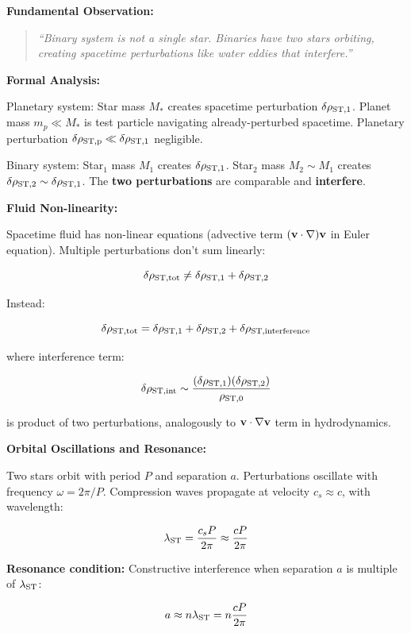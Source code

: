 \documentclass[11pt,a4paper]{article}
\begin{document}
\textbf{Fundamental Observation:}

\begin{quote}
\emph{``Binary system is not a single star. Binaries have two stars
orbiting, creating spacetime perturbations like water eddies that
interfere.''}
\end{quote}

\textbf{Formal Analysis:}

Planetary system: Star mass \(M_*\) creates spacetime perturbation
\(\delta \rho_{\rm ST,1}\). Planet mass \(m_p \ll M_*\) is test particle
navigating already-perturbed spacetime. Planetary perturbation
\(\delta \rho_{\rm ST,p} \ll \delta \rho_{\rm ST,1}\) negligible.

Binary system: Star$_{1}$ mass \(M_1\) creates \(\delta \rho_{\rm ST,1}\).
Star$_{2}$ mass \(M_2 \sim M_1\) creates
\(\delta \rho_{\rm ST,2} \sim \delta \rho_{\rm ST,1}\). The \textbf{two
perturbations} are comparable and \textbf{interfere}.

\textbf{Fluid Non-linearity:}

Spacetime fluid has non-linear equations (advective term
\(({\bf v} \cdot \nabla){\bf v}\) in Euler equation). Multiple
perturbations don't sum linearly:

\[\delta \rho_{\rm ST,tot} \neq \delta \rho_{\rm ST,1} + \delta \rho_{\rm ST,2}\]

Instead:

\[\delta \rho_{\rm ST,tot} = \delta \rho_{\rm ST,1} + \delta \rho_{\rm ST,2} + \delta \rho_{\rm ST,interference}\]

where interference term:

\[\delta \rho_{\rm ST,int} \sim \frac{(\delta \rho_{\rm ST,1}) (\delta \rho_{\rm ST,2})}{\rho_{\rm ST,0}}\]

is product of two perturbations, analogously to
\({\bf v} \cdot \nabla {\bf v}\) term in hydrodynamics.

\textbf{Orbital Oscillations and Resonance:}

Two stars orbit with period \(P\) and separation \(a\). Perturbations
oscillate with frequency \(\omega = 2\pi/P\). Compression waves
propagate at velocity \(c_s \approx c\), with wavelength:

\[\lambda_{\rm ST} = \frac{c_s P}{2\pi} \approx \frac{c P}{2\pi}\]

\textbf{Resonance condition:} Constructive interference when separation
\(a\) is multiple of \(\lambda_{\rm ST}\):

\[a \approx n \lambda_{\rm ST} = n \frac{c P}{2\pi}\]
\end{document}

